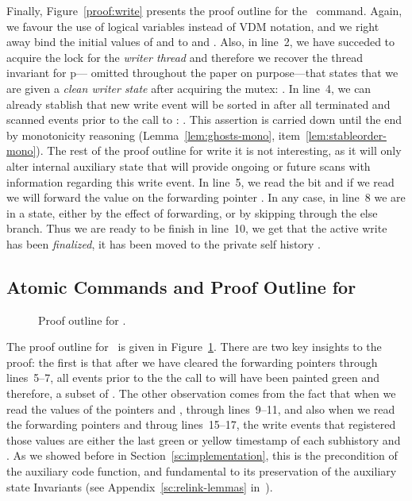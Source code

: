 Finally, Figure~\ref{proof:write} presents the proof outline for the
\jywrite\ command. Again, we favour the use of logical variables
instead of VDM notation, and we right away bind the initial values of
 and  to  and . Also, in line~2, we have
succeded to acquire the lock for the {\it writer thread}  and
therefore we recover the thread invariant for p--- omitted throughout
the paper on purpose---that states that we are given a {\it clean
  writer state } after acquiring the mutex: . In line~4,
we can already stablish that new write event  will be sorted in
 after all terminated and scanned events prior to the
call to \jywrite: . This assertion is carried down until the
end by monotonicity reasoning (Lemma~\ref{lem:ghosts-mono},
item~\ref{lem:stableorder-mono}). The rest of the proof outline for
write it is not interesting, as it will only alter internal auxiliary
state that will provide ongoing or future scans with information
regarding this write event. In line~5, we read the bit  and if we
read  we will forward the value on the forwarding pointer
. In any case, in line~8 we are in a 
state, either by the effect of forwarding, or by skipping through the
else branch. Thus we are ready to be finish in line~10, we get that
the active write has been {\it finalized}, \ie it has been moved to
the private self history .

\subsection{Atomic Commands and Proof Outline for \jywrite}
\label{sc:atoms-write}

\def\botLGY{{\ensuremath{\mathsf{fwdLastGY}}}}
\def\histLGY{{\ensuremath{\mathsf{lastGYHist}}}}
\def\greenH{{\ensuremath{\mathsf{green\_prefix}}}}
\newcommand{\spz}{S_z}

\begin{figure}[!htp]

  \caption{\label{proof:scan} Proof outline for .}
\end{figure}
 
The proof outline for \jyscan\ is given in
Figure~\ref{proof:scan}. There are two key insights to the proof: the
first is that after we have cleared the forwarding pointers through
lines~5--7, all events prior to the the call to  will have
been painted green and therefore, a subset of . The other observation comes from the fact that when we
read the values of the pointers  and , through lines~9--11, and
also when we read the forwarding pointers  and  throug
lines~15--17, the write events that registered those values are either
the last green or yellow timestamp of each subhistory  and
. As we showed before in Section~\ref{sc:implementation}, this
is the precondition of the  auxiliary code function, and
fundamental to its preservation of the auxiliary state Invariants (see
Appendix~\ref{sc:relink-lemmas} in~\cite{CoqFiles}).

